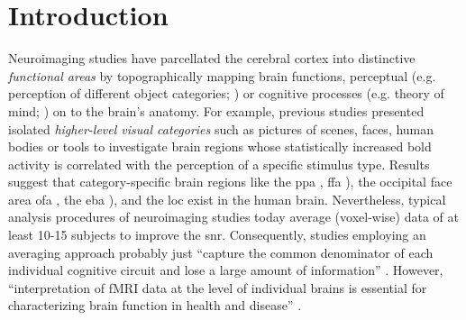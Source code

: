 \section{Introduction}





Neuroimaging studies have parcellated the cerebral cortex into distinctive
\textit{functional areas} by topographically mapping brain functions, perceptual
(e.g. perception of different object categories; \citet{kanwisher1997ffa}) or
cognitive processes (e.g. theory of mind; \citet{spunt2014validating}) on to the
brain's anatomy.
For example, previous studies presented isolated \textit{higher-level visual
categories} such as pictures of scenes, faces, human bodies or tools to
investigate brain regions whose statistically increased \ac{bold} activity is
correlated with the perception of a specific stimulus type.
Results suggest that category-specific brain regions like the \ac{ppa}
\citep{epstein1998ppa}, \ac{ffa} \citep{kanwisher1997ffa}), the occipital face
area \ac{ofa} \citep{pitcher2011occipitalfacearea}, the \ac{eba}
\citep{downing2001bodyarea}), and the \ac{loc} \citet{malach1995loc} exist in
the human brain.
%
Nevertheless, typical analysis procedures of neuroimaging studies today average
(voxel-wise) data of at least 10-15 subjects to improve the \ac{snr}.
%
Consequently, studies employing an averaging approach probably just ``capture
the common denominator of each individual cognitive circuit and lose a large
amount of information'' \citep{pinel2007fast}.
%
However, ``interpretation of fMRI data at the level of individual brains is
essential for characterizing brain function in health and disease''
\citep{dubois2016building}.


